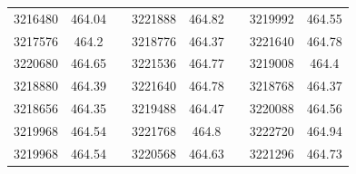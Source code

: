 \documentclass[12pt]{mwart}
\begin{document}
\begin{table}[H]
\begin{tabular}{cclcclcc}
		3216480                                                  & 464.04                                                        &  & 3221888                                                  & 464.82                                                        &  & 3219992                                                  & 464.55                                                        \\
		3217576                                                  & 464.2                                                         &  & 3218776                                                  & 464.37                                                        &  & 3221640                                                  & 464.78                                                        \\
		3220680                                                  & 464.65                                                        &  & 3221536                                                  & 464.77                                                        &  & 3219008                                                  & 464.4                                                         \\
		3218880                                                  & 464.39                                                        &  & 3221640                                                  & 464.78                                                        &  & 3218768                                                  & 464.37                                                        \\
		3218656                                                  & 464.35                                                        &  & 3219488                                                  & 464.47                                                        &  & 3220088                                                  & 464.56                                                        \\
		3219968                                                  & 464.54                                                        &  & 3221768                                                  & 464.8                                                         &  & 3222720                                                  & 464.94                                                        \\
		3219968                                                  & 464.54                                                        &  & 3220568                                                  & 464.63                                                        &  & 3221296                                                  & 464.73                                                        \\

\end{tabular}
\end{table}
\end{document}
